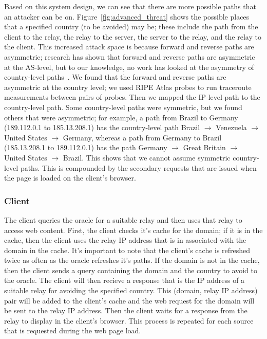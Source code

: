 Based on this system design, we can see that there are more possible paths that an attacker can be on.  Figure~\ref{fig:advanced_threat} shows the possible places that a specified country (to be avoided) may be; these include the path from the client to the relay, the relay to the server, the server to the relay, and the relay to the client.  This increased attack space is because forward and reverse paths are asymmetric; research has shown that forward and reverse paths are asymmetric at the AS-level, but to our knowledge, no work has looked at the asymmetry of country-level paths~\cite{he2005routing}.  We found that the forward and reverse paths are asymmetric at the country level; we used RIPE Atlas probes to run traceroute measurements between pairs of probes.  Then we mapped the IP-level path to the country-level path.  Some country-level paths were symmetric, but we found others that were asymmetric; for example, a path from Brazil to Germany (189.112.0.1 to 185.13.208.1) has the country-level path Brazil $\rightarrow$ Venezuela $\rightarrow$ United States $\rightarrow$ Germany, whereas a path from Germany to Brazil (185.13.208.1 to 189.112.0.1) has the path Germany $\rightarrow$ Great Britain $\rightarrow$ United States $\rightarrow$ Brazil.  This shows that we cannot assume symmetric country-level paths. This is compounded by the secondary requests that are issued when the page is loaded on the client's browser.  

\subsubsection{Client} The client queries the oracle for a suitable relay and then uses that relay to access web content.  First, the client checks it's cache for the domain; if it is in the cache, then the client uses the relay IP address that is in associated with the domain in the cache.  It's important to note that the client's cache is refreshed twice as often as the oracle refreshes it's paths.  If the domain is not in the cache, then the client sends a query containing the domain and the country to avoid to the oracle.  The client will then recieve a response that is the IP address of a suitable relay for avoiding the specified country.  This (domain, relay IP address) pair will be added to the client's cache and the web request for the domain will be sent to the relay IP address.  Then the client waits for a response from the relay to display in the client's browser.  This process is repeated for each source that is requested during the web page load.  


